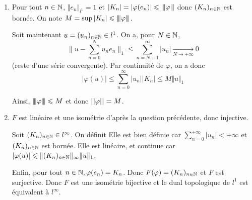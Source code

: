 \begin{solution}
	\phantom{}
	\begin{enumerate}
		\item Pour tout $n\in\mathbb{N}$, $\Vert e_{n}\Vert_{l^{1}}=1$ et $\vert K_{n}\vert=\vert\varphi(e_{n})\vert\leqslant{\left\vert\kern-0.25ex\left\vert\kern-0.25ex\left\vert{}\varphi \right\vert\kern-0.25ex\right\vert\kern-0.25ex\right\vert}$ donc $(K_{n})_{n\in\mathbb{N}}$ est bornée. On note $M=\sup\vert K_{n}\vert\leqslant{\left\vert\kern-0.25ex\left\vert\kern-0.25ex\left\vert{}\varphi \right\vert\kern-0.25ex\right\vert\kern-0.25ex\right\vert}$.
		
		Soit maintenant $u=(u_{n})_{n\in\mathbb{N}}\in l^{1}$. On a, pour $N\in\mathbb{N}$, 
		$$\Biggl\lVert u-\sum_{n=0}^{N}u_{n}e_{n}\Biggr\rVert_{1}\leqslant\sum_{n=N+1}^{\infty}\vert u_{n}\vert\xrightarrow[N\to+\infty]{}0$$
		(reste d'une série convergente). Par continuité de $\varphi$, on a donc 
		$$\vert \varphi(u)\vert\leqslant\sum_{n=0}^{\infty}\vert u_{n}\vert \vert K_{n}\vert\leqslant M\Vert u\Vert_{1}$$

		Ainsi, ${\left\vert\kern-0.25ex\left\vert\kern-0.25ex\left\vert{}\varphi \right\vert\kern-0.25ex\right\vert\kern-0.25ex\right\vert}\leqslant M$ et donc ${\left\vert\kern-0.25ex\left\vert\kern-0.25ex\left\vert{}\varphi \right\vert\kern-0.25ex\right\vert\kern-0.25ex\right\vert}=M$.

		\item $F$ est linéaire et une isométrie d'après la question précédente, donc injective. 
		
		Soit $(K_{n})_{n\in\mathbb{N}}\in l^{\infty}$. On définit 
		Elle est bien définie car $\sum_{n=0}^{+\infty}\vert u_{n}\vert<+\infty$ et $(K_{n})_{n\in\mathbb{N}}$ est bornée. Elle est linéaire, et continue car $\vert\varphi(u)\vert\leqslant\Vert(K_{n})_{n\in\mathbb{N}}\Vert_{\infty}\Vert u\Vert_{1}$.

		Enfin, pour tout $n\in\mathbb{N},\varphi(e_{n})=K_{n}$. Donc $F(\varphi)=(K_{n})_{n\in\mathbb{N}}$ et $F$ est surjective. Donc $F$ est une isométrie bijective et le dual topologique de $l^{1}$ est équivalent à $l^{\infty}$.
	\end{enumerate}
\end{solution}

